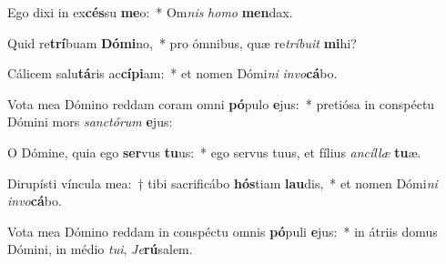 \item Ego dixi in ex\textbf{cés}su \textbf{me}o:~* Om\textit{nis} \textit{ho}\textit{mo} \textbf{men}dax.
\item Quid re\textbf{trí}buam \textbf{Dó}\textbf{mi}no,~* pro ómnibus, quæ re\textit{trí}\textit{bu}\textit{it} \textbf{mi}hi?
\item Cálicem salu\textbf{tá}ris ac\textbf{cí}\textbf{pi}am:~* et nomen Dómi\textit{ni} \textit{in}\textit{vo}\textbf{cá}bo.
\item Vota mea Dómino reddam coram omni \textbf{pó}pulo \textbf{e}jus:~* pretiósa in conspéctu Dómini mors \textit{sanc}\textit{tó}\textit{rum} \textbf{e}jus:
\item O Dómine, quia ego \textbf{ser}vus \textbf{tu}us:~* ego servus tuus, et fílius \textit{an}\textit{cíl}\textit{læ} \textbf{tu}æ.
\item Dirupísti víncula mea:~† tibi sacrificábo \textbf{hós}tiam \textbf{lau}dis,~* et nomen Dómi\textit{ni} \textit{in}\textit{vo}\textbf{cá}bo.
\item Vota mea Dómino reddam in conspéctu omnis \textbf{pó}puli \textbf{e}jus:~* in átriis domus Dómini, in médio \textit{tu}\textit{i}, \textit{Je}\textbf{rú}salem.
